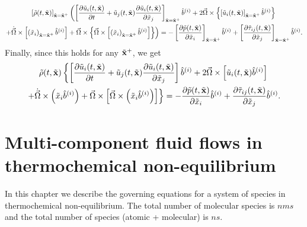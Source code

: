 \documentclass[oneside,a4paper,11pt]{report}
\begin{document}
\begin{multline}
    \left [ \tilde{\rho}(t,\tilde{\mathbf{x}}) \right]_{\tilde{\mathbf{x}} = \tilde{\mathbf{x}}^+} \left ( \left [ \frac{\partial \tilde{u}_i(t,\tilde{\mathbf{x}})}{\partial t} + \tilde{u}_j(t,\tilde{\mathbf{x}}) \frac{\partial \tilde{u}_i(t,\tilde{\mathbf{x}})}{\partial \tilde{x}_j} \right ]_{\tilde{\mathbf{x}} = \tilde{\mathbf{x}}^+} \hat{b}^{(i)} + 2 \vec{\Omega} \times \left \{ \left [\tilde{u}_i(t,\tilde{\mathbf{x}}) \right ]_{\tilde{\mathbf{x}} = \tilde{\mathbf{x}}^+} \hat{b}^{(i)} \right \} \right . \\
    \left . + \dot{\vec{\Omega}} \times \left [ \left ( \tilde{x}_i \right)_{\tilde{\mathbf{x}} = \tilde{\mathbf{x}}^+} \hat{b}^{(i)}\right ] + \vec{\Omega} \times \left \{ \vec{\Omega} \times \left [ \left ( \tilde{x}_i \right )_{\tilde{\mathbf{x}} = \tilde{\mathbf{x}}^+} \hat{b}^{(i)}\right ] \right \} \right ) = -\left [ \frac{\partial \tilde{p}(t,\tilde{\mathbf{x}})}{\partial \tilde{x}_i} \right]_{\tilde{\mathbf{x}} = \tilde{\mathbf{x}}^+} \hat{b}^{(i)} + \left [ \frac{\partial \tilde{\tau}_{ij}(t,\tilde{\mathbf{x}})}{\partial \tilde{x}_j} \right ]_{\tilde{\mathbf{x}} = \tilde{\mathbf{x}}^+} \hat{b}^{(i)}.
\end{multline}
Finally, since this holds for any $\tilde{\mathbf{x}}^+$, we get
\begin{multline}
    \tilde{\rho}(t,\tilde{\mathbf{x}}) \left \{ \left [ \frac{\partial \tilde{u}_i(t,\tilde{\mathbf{x}})}{\partial t} + \tilde{u}_j(t,\tilde{\mathbf{x}}) \frac{\partial \tilde{u}_i(t,\tilde{\mathbf{x}})}{\partial \tilde{x}_j} \right ] \hat{b}^{(i)} + 2 \vec{\Omega} \times \left [ \tilde{u}_i(t,\tilde{\mathbf{x}}) \hat{b}^{(i)} \right ] \right . \\
    \left . + \dot{\vec{\Omega}} \times \left ( \tilde{x}_i \hat{b}^{(i)}\right ) + \vec{\Omega} \times \left [ \vec{\Omega} \times \left ( \tilde{x}_i \hat{b}^{(i)} \right ) \right ] \right \} = -\frac{\partial \tilde{p}(t,\tilde{\mathbf{x}})}{\partial \tilde{x}_i} \hat{b}^{(i)} + \frac{\partial \tilde{\tau}_{ij}(t,\tilde{\mathbf{x}})}{\partial \tilde{x}_j} \hat{b}^{(i)}.
\end{multline}

\chapter{Multi-component fluid flows in thermochemical non-equilibrium}
In this chapter we describe the governing equations for a system of species in thermochemical non-equilibrium. The total number of molecular species is $nms$ and the total number of species (atomic + molecular) is $ns$.
\end{document}
